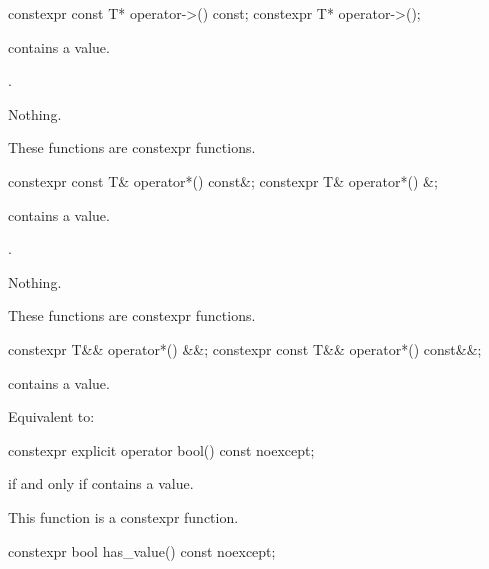 %
\begin{itemdecl}
constexpr const T* operator->() const;
constexpr T* operator->();
\end{itemdecl}

\begin{itemdescr}
\pnum
\expects
{} contains a value.

\pnum
\returns
{}.

\pnum
\throws
Nothing.

\pnum
\remarks
These functions are constexpr functions.
\end{itemdescr}

%
\begin{itemdecl}
constexpr const T& operator*() const&;
constexpr T& operator*() &;
\end{itemdecl}

\begin{itemdescr}
\pnum
\expects
{} contains a value.

\pnum
\returns
{}.

\pnum
\throws
Nothing.

\pnum
\remarks
These functions are constexpr functions.
\end{itemdescr}

%
\begin{itemdecl}
constexpr T&& operator*() &&;
constexpr const T&& operator*() const&&;
\end{itemdecl}

\begin{itemdescr}
\pnum
\expects
{} contains a value.

\pnum
\effects
Equivalent to: 
\end{itemdescr}

%
\begin{itemdecl}
constexpr explicit operator bool() const noexcept;
\end{itemdecl}

\begin{itemdescr}
\pnum
\returns
{} if and only if  contains a value.

\pnum
\remarks
This function is a constexpr function.
\end{itemdescr}

%
\begin{itemdecl}
constexpr bool has_value() const noexcept;
\end{itemdecl}

